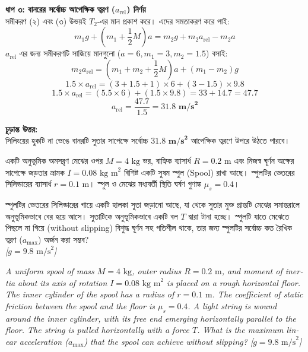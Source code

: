 \documentclass[12pt, a4paper]{article}
\begin{document}
\begin{tcolorbox}[solutionbox={সমাধান (Solution)}]
\vspace{0.5em}
\noindent
\textbf{ধাপ ৩: বানরের সর্বোচ্চ আপেক্ষিক ত্বরণ ($a_{\text{rel}}$) নির্ণয়} \\
সমীকরণ (২) এবং (৩) উভয়ই $T_2$-এর মান প্রকাশ করে। এদের সমতাকরণ করে পাই:
\[ m_1 g + \left(m_1 + \frac{1}{2}M\right)a = m_2 g + m_2 a_{\text{rel}} - m_2 a \]
$a_{\text{rel}}$ এর জন্য সমীকরণটি সাজিয়ে মানগুলো ($a=6, m_1=3, m_2=1.5$) বসাই:
\[ m_2 a_{\text{rel}} = \left(m_1 + m_2 + \frac{1}{2}M\right)a + (m_1 - m_2)g \]
\[ 1.5 \times a_{\text{rel}} = \left(3 + 1.5 + 1\right) \times 6 + (3 - 1.5) \times 9.8 \]
\[ 1.5 \times a_{\text{rel}} = (5.5 \times 6) + (1.5 \times 9.8) = 33 + 14.7 = 47.7 \]
\[ a_{\text{rel}} = \frac{47.7}{1.5} = \mathbf{31.8\text{ m/s}^2} \]

\vspace{1em}
\begin{tcolorbox}[answerbox]
\textbf{চূড়ান্ত উত্তর:} \\
সিলিংয়ের হুকটি না ভেঙে বানরটি সুতার সাপেক্ষে সর্বোচ্চ $\mathbf{31.8 \text{ m/s}^2}$ আপেক্ষিক ত্বরণে উপরে উঠতে পারবে।
\end{tcolorbox}
\end{tcolorbox}

\begin{tcolorbox}[questionbox={প্রশ্ন (Question) 6}]
\noindent
একটি অনুভূমিক অমসরৃণ মেঝের ওপর $M = 4\text{ kg}$ ভর, বাহ্যিক ব্যাসার্ধ $R = 0.2\text{ m}$ এবং নিজস্ব ঘূর্ণন অক্ষের সাপেক্ষে জড়তার ভ্রামক $I = 0.08\text{ kg m}^2$ বিশিষ্ট একটি সুষম স্পুল (Spool) রাখা আছে। স্পুলটির ভেতরের সিলিন্ডারের ব্যাসার্ধ $r = 0.1\text{ m}$। স্পুল ও মেঝের মধ্যবর্তী স্থিতি ঘর্ষণ গুণাঙ্ক $\mu_s = 0.4$। 

\vspace{0.3em}
\noindent
স্পুলটির ভেতরের সিলিন্ডারের গায়ে একটি হালকা সুতা জড়ানো আছে, যা থেকে সুতার মুক্ত প্রান্তটি মেঝের সমান্তরালে অনুভূমিকভাবে বের হয়ে আসে। সুতাটিকে অনুভূমিকভাবে একটি বল $T$ দ্বারা টানা হচ্ছে। স্পুলটি যাতে মেঝেতে পিছলে না গিয়ে (without slipping) বিশুদ্ধ ঘূর্ণন সহ গতিশীল থাকে, তার জন্য স্পুলটির সর্বোচ্চ কত রৈখিক ত্বরণ ($a_{\text{max}}$) অর্জন করা সম্ভব? \\
\textit{[$g = 9.8\text{ m/s}^2$]}

\vspace{0.8em}
\begin{english}
\noindent\textit{\color{darkgray}
A uniform spool of mass $M = 4\text{ kg}$, outer radius $R = 0.2\text{ m}$, and moment of inertia about its axis of rotation $I = 0.08\text{ kg m}^2$ is placed on a rough horizontal floor. The inner cylinder of the spool has a radius of $r = 0.1\text{ m}$. The coefficient of static friction between the spool and the floor is $\mu_s = 0.4$. A light string is wound around the inner cylinder, with its free end emerging horizontally parallel to the floor. The string is pulled horizontally with a force $T$. What is the maximum linear acceleration ($a_{\text{max}}$) that the spool can achieve without slipping? [$g = 9.8\text{ m/s}^2$]
}
\end{english}
\end{tcolorbox}
\end{document}
